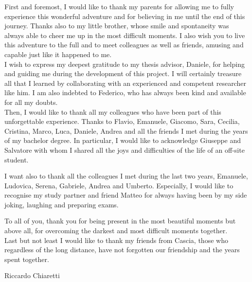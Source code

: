 \documentclass[LaM,binding=0.6cm]{sapthesis}
\begin{document}
\begin{acknowledgments}
First and foremost, I would like to thank my parents for allowing me to fully experience this wonderful adventure and for believing in me until the end of this journey. Thanks also to my little brother, whose smile and spontaneity was always able to cheer me up in the most difficult moments. I also wish you to live this adventure to the full and to meet colleagues as well as friends, amusing and capable just like it happened to me.\\

I wish to express my deepest gratitude to my thesis advisor, Daniele, for helping and guiding me during the development of this project. I will certainly treasure all that I learned by collaborating with an experienced and competent researcher like him. I am also indebted to Federico, who has always been kind and available for all my doubts.\\

Then, I would like to thank all my colleagues who have been part of this unforgettable experience. Thanks to Flavio, Emanuele, Giacomo, Sara, Cecilia, Cristina, Marco, Luca, Daniele, Andrea and all the friends I met during the years of my bachelor degree. In particular, I would like to acknowledge Giuseppe and Salvatore with whom I shared all the joys and difficulties of the life of an off-site student.

I want also to thank all the colleagues I met during the last two years, Emanuele, Ludovica, Serena, Gabriele, Andrea and Umberto. Especially, I would like to recognise my study partner and friend Matteo for always having been by my side joking, laughing and preparing exams.

To all of you, thank you for being present in the most beautiful moments but above all, for overcoming the darkest and most difficult moments together.\\

Last but not least I would like to thank my friends from Cascia, those who regardless of the long distance, have not forgotten our friendship and the years spent together.
\vspace{10mm}

\begin{flushright}
Riccardo Chiaretti
\end{flushright}
\end{acknowledgments}

\tableofcontents

\mainmatter
\end{document}
